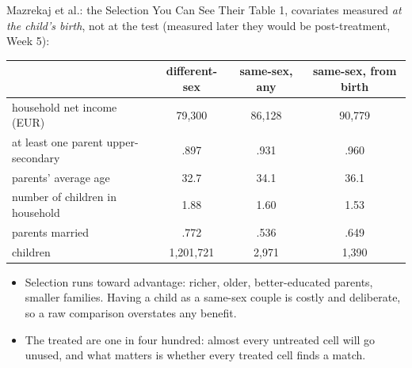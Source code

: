 \documentclass[aspectratio=169,11pt,xcolor=dvipsnames]{beamer}
\begin{document}
\begin{frame}{Mazrekaj et al.: the Selection You Can See}
Their Table 1, covariates measured \emph{at the child's birth}, not at the test
(measured later they would be post-treatment, Week 5):
\begin{center}\footnotesize
\renewcommand{\arraystretch}{1.05}
\begin{tabular}{lccc}
\toprule
 & different-sex & same-sex, any & same-sex, from birth \\
\midrule
household net income (EUR)      & 79,300 & 86,128 & 90,779 \\
at least one parent upper-secondary & .897 & .931 & .960 \\
parents' average age            & 32.7 & 34.1 & 36.1 \\
number of children in household & 1.88 & 1.60 & 1.53 \\
parents married                 & .772 & .536 & .649 \\
children                        & 1,201,721 & 2,971 & 1,390 \\
\bottomrule
\end{tabular}
\end{center}
\vskip2pt
\begin{itemize}\itemsep2pt
  \item Selection runs toward advantage: richer, older, better-educated parents,
        smaller families. Having a child as a same-sex couple is costly and
        deliberate, so a raw comparison overstates any benefit.
  \item The treated are one in four hundred: almost every untreated cell will go
        unused, and what matters is whether every treated cell finds a match.
\end{itemize}
\end{frame}
\end{document}
